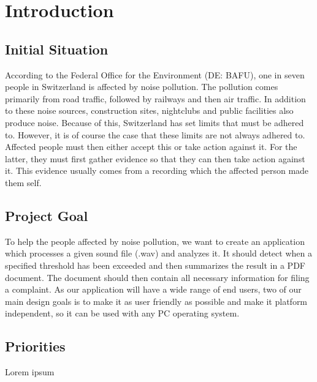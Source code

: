 \section{Introduction}

\subsection{Initial Situation}

According to the Federal Office for the Environment (DE: BAFU), one in seven people in Switzerland is affected by noise pollution.
The pollution comes primarily from road traffic, followed by railways and then air traffic.
In addition to these noise sources, construction sites, nightclubs and public facilities also produce noise.
Because of this, Switzerland has set limits that must be adhered to.
However, it is of course the case that these limits are not always adhered to.
Affected people must then either accept this or take action against it.
For the latter, they must first gather evidence so that they can then take action against it.
This evidence usually comes from a recording which the affected person made them self.

\subsection{Project Goal}
To help the people affected by noise pollution, we want to create an application which processes a given sound file (.wav)
and analyzes it.
It should detect when a specified threshold has been exceeded and then summarizes the result in a PDF document.
The document should then contain all necessary information for filing a complaint.
As our application will have a wide range of end users, two of our main design goals is to make it as user friendly as possible
and make it platform independent, so it can be used with any PC operating system.

\subsection{Priorities}
Lorem ipsum



